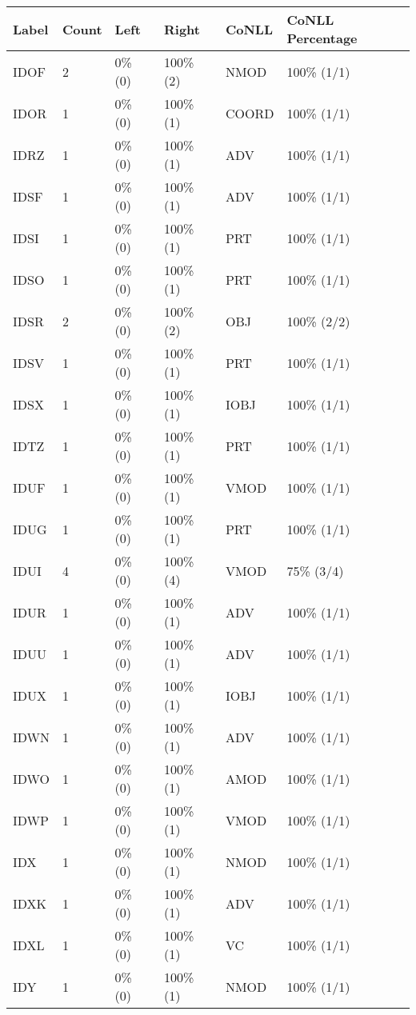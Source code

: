 \begin{figure*}
\begin{tabular}{|l|l|l|l||l|l|}
\hline
Label & Count & Left & Right & CoNLL & CoNLL Percentage\\ 
\hline
 IDOF & 2 & 0\% (0) & 100\% (2) & NMOD & 100\% (1/1) \\ 
\hline
 IDOR & 1 & 0\% (0) & 100\% (1) & COORD & 100\% (1/1) \\ 
\hline
 IDRZ & 1 & 0\% (0) & 100\% (1) & ADV & 100\% (1/1) \\ 
\hline
 IDSF & 1 & 0\% (0) & 100\% (1) & ADV & 100\% (1/1) \\ 
\hline
 IDSI & 1 & 0\% (0) & 100\% (1) & PRT & 100\% (1/1) \\ 
\hline
 IDSO & 1 & 0\% (0) & 100\% (1) & PRT & 100\% (1/1) \\ 
\hline
 IDSR & 2 & 0\% (0) & 100\% (2) & OBJ & 100\% (2/2) \\ 
\hline
 IDSV & 1 & 0\% (0) & 100\% (1) & PRT & 100\% (1/1) \\ 
\hline
 IDSX & 1 & 0\% (0) & 100\% (1) & IOBJ & 100\% (1/1) \\ 
\hline
 IDTZ & 1 & 0\% (0) & 100\% (1) & PRT & 100\% (1/1) \\ 
\hline
 IDUF & 1 & 0\% (0) & 100\% (1) & VMOD & 100\% (1/1) \\ 
\hline
 IDUG & 1 & 0\% (0) & 100\% (1) & PRT & 100\% (1/1) \\ 
\hline
 IDUI & 4 & 0\% (0) & 100\% (4) & VMOD & 75\% (3/4) \\ 
\hline
 IDUR & 1 & 0\% (0) & 100\% (1) & ADV & 100\% (1/1) \\ 
\hline
 IDUU & 1 & 0\% (0) & 100\% (1) & ADV & 100\% (1/1) \\ 
\hline
 IDUX & 1 & 0\% (0) & 100\% (1) & IOBJ & 100\% (1/1) \\ 
\hline
 IDWN & 1 & 0\% (0) & 100\% (1) & ADV & 100\% (1/1) \\ 
\hline
 IDWO & 1 & 0\% (0) & 100\% (1) & AMOD & 100\% (1/1) \\ 
\hline
 IDWP & 1 & 0\% (0) & 100\% (1) & VMOD & 100\% (1/1) \\ 
\hline
 IDX & 1 & 0\% (0) & 100\% (1) & NMOD & 100\% (1/1) \\ 
\hline
 IDXK & 1 & 0\% (0) & 100\% (1) & ADV & 100\% (1/1) \\ 
\hline
 IDXL & 1 & 0\% (0) & 100\% (1) & VC & 100\% (1/1) \\ 
\hline
 IDY & 1 & 0\% (0) & 100\% (1) & NMOD & 100\% (1/1) \\ 

\end{tabular}
\end{figure*}
